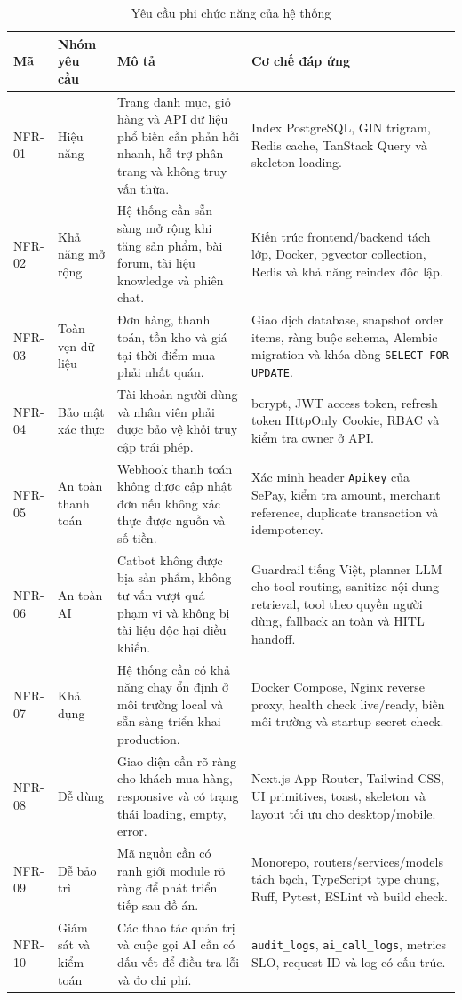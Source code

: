 \documentclass[../DoAn.tex]{subfiles}
\begin{document}
{\normalsize
\setlength{\LTleft}{\fill}
\setlength{\LTright}{\fill}
\setlength{\tabcolsep}{3pt}
\renewcommand{\arraystretch}{1.25}
\begin{longtable}{|>{\raggedright\arraybackslash}p{1.8cm}|>{\raggedright\arraybackslash}p{2.5cm}|>{\raggedright\arraybackslash}p{4.6cm}|>{\raggedright\arraybackslash}p{4.05cm}|}
\caption{Yêu cầu phi chức năng của hệ thống}
\label{table:2.3}\\
\hline
\textbf{Mã} & \textbf{Nhóm yêu cầu} & \textbf{Mô tả} & \textbf{Cơ chế đáp ứng} \\ \hline
NFR-01 & Hiệu năng & Trang danh mục, giỏ hàng và API dữ liệu phổ biến cần phản hồi nhanh, hỗ trợ phân trang và không truy vấn thừa. & Index PostgreSQL, GIN trigram, Redis cache, TanStack Query và skeleton loading. \\ \hline
NFR-02 & Khả năng mở rộng & Hệ thống cần sẵn sàng mở rộng khi tăng sản phẩm, bài forum, tài liệu knowledge và phiên chat. & Kiến trúc frontend/backend tách lớp, Docker, pgvector collection, Redis và khả năng reindex độc lập. \\ \hline
NFR-03 & Toàn vẹn dữ liệu & Đơn hàng, thanh toán, tồn kho và giá tại thời điểm mua phải nhất quán. & Giao dịch database, snapshot order items, ràng buộc schema, Alembic migration và khóa dòng \texttt{SELECT FOR UPDATE}. \\ \hline
NFR-04 & Bảo mật xác thực & Tài khoản người dùng và nhân viên phải được bảo vệ khỏi truy cập trái phép. & bcrypt, JWT access token, refresh token HttpOnly Cookie, RBAC và kiểm tra owner ở API. \\ \hline
NFR-05 & An toàn thanh toán & Webhook thanh toán không được cập nhật đơn nếu không xác thực được nguồn và số tiền. & Xác minh header \texttt{Apikey} của SePay, kiểm tra amount, merchant reference, duplicate transaction và idempotency. \\ \hline
NFR-06 & An toàn AI & Catbot không được bịa sản phẩm, không tư vấn vượt quá phạm vi và không bị tài liệu độc hại điều khiển. & Guardrail tiếng Việt, planner LLM cho tool routing, sanitize nội dung retrieval, tool theo quyền người dùng, fallback an toàn và HITL handoff. \\ \hline
NFR-07 & Khả dụng & Hệ thống cần có khả năng chạy ổn định ở môi trường local và sẵn sàng triển khai production. & Docker Compose, Nginx reverse proxy, health check live/ready, biến môi trường và startup secret check. \\ \hline
NFR-08 & Dễ dùng & Giao diện cần rõ ràng cho khách mua hàng, responsive và có trạng thái loading, empty, error. & Next.js App Router, Tailwind CSS, UI primitives, toast, skeleton và layout tối ưu cho desktop/mobile. \\ \hline
NFR-09 & Dễ bảo trì & Mã nguồn cần có ranh giới module rõ ràng để phát triển tiếp sau đồ án. & Monorepo, routers/services/models tách bạch, TypeScript type chung, Ruff, Pytest, ESLint và build check. \\ \hline
NFR-10 & Giám sát và kiểm toán & Các thao tác quản trị và cuộc gọi AI cần có dấu vết để điều tra lỗi và đo chi phí. & \texttt{audit\_logs}, \texttt{ai\_call\_logs}, metrics SLO, request ID và log có cấu trúc. \\ \hline
\end{longtable}
}
\end{document}

